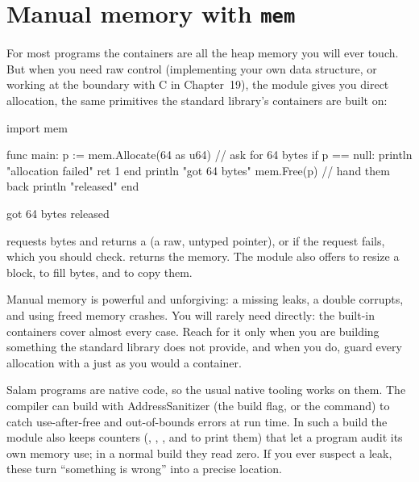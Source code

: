 \section{Manual memory with \texttt{mem}}

For most programs the containers are all the heap memory you will ever touch. But
when you need raw control (implementing your own data structure, or working at
the boundary with C in Chapter~19), the  module gives you direct
allocation, the same primitives the standard library's containers are built on:

\begin{salamen}
import mem

func main:
    p := mem.Allocate(64 as u64)     // ask for 64 bytes
    if p == null:
        println "allocation failed"
        ret 1
    end
    println "got 64 bytes"
    mem.Free(p)                            // hand them back
    println "released"
end
\end{salamen}

\begin{progout}
got 64 bytes
released
\end{progout}

 requests  bytes and returns a  (a raw,
untyped pointer), or  if the request fails, which you should check.
 returns the memory. The module also offers
 to resize a block,  to fill bytes, and
 to copy them.

\begin{warn}
Manual memory is powerful and unforgiving: a missing  leaks, a double
 corrupts, and using freed memory crashes. You will rarely need
 directly: the built-in containers cover almost every case. Reach for
it only when you are building something the standard library does not provide, and
when you do, guard every allocation with a  just as you would
a container.
\end{warn}

\begin{deep}
Salam programs are native code, so the usual native tooling works on them. The
compiler can build with AddressSanitizer (the  build flag, or the
 command) to catch use-after-free and out-of-bounds errors
at run time. In such a build the  module also keeps counters
(, , , and
 to print them) that let a program audit its own memory
use; in a normal build they read zero. If you ever
suspect a leak, these turn ``something is wrong'' into a precise location.
\end{deep}

